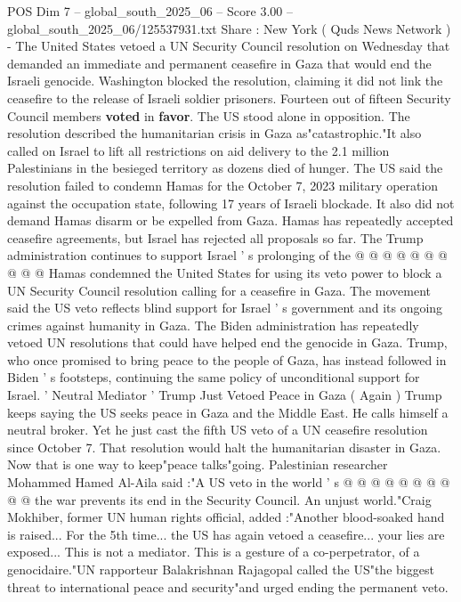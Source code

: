 \begin{textsample}{POS Dim 7 – global\_south\_2025\_06 – Score 3.00 – global\_south\_2025\_06/125537931.txt}  \label{ex:f7_pos_403}
Share : New York ( Quds News Network ) - The United States vetoed a UN Security Council resolution on Wednesday that demanded an immediate and permanent ceasefire in Gaza that would end the Israeli genocide.
Washington blocked the resolution, claiming it did not link the ceasefire to the release of Israeli soldier prisoners.
Fourteen out of fifteen Security Council members \textbf{voted} in \textbf{favor}.
The US stood alone in opposition.
The resolution described the humanitarian crisis in Gaza as"catastrophic."It also called on Israel to lift all restrictions on aid delivery to the 2.1 million Palestinians in the besieged territory as dozens died of hunger.
The US said the resolution failed to condemn Hamas for the October 7, 2023 military operation against the occupation state, following 17 years of Israeli blockade.
It also did not demand Hamas disarm or be expelled from Gaza.
Hamas has repeatedly accepted ceasefire agreements, but Israel has rejected all proposals so far.
The Trump administration continues to support Israel ' s prolonging of the @ @ @ @ @ @ @ @ @ @ Hamas condemned the United States for using its veto power to block a UN Security Council resolution calling for a ceasefire in Gaza.
The movement said the US veto reflects blind support for Israel ' s government and its ongoing crimes against humanity in Gaza.
The Biden administration has repeatedly vetoed UN resolutions that could have helped end the genocide in Gaza.
Trump, who once promised to bring peace to the people of Gaza, has instead followed in Biden ' s footsteps, continuing the same policy of unconditional support for Israel. ' Neutral Mediator ' Trump Just Vetoed Peace in Gaza ( Again ) Trump keeps saying the US seeks peace in Gaza and the Middle East.
He calls himself a neutral broker.
Yet he just cast the fifth US veto of a UN ceasefire resolution since October 7.
That resolution would halt the humanitarian disaster in Gaza.
Now that is one way to keep"peace talks"going.
Palestinian researcher Mohammed Hamed Al-Aila said :"A US veto in the world ' s @ @ @ @ @ @ @ @ @ @ the war prevents its end in the Security Council.
An unjust world."Craig Mokhiber, former UN human rights official, added :"Another blood-soaked hand is raised...
For the 5th time... the US has again vetoed a ceasefire... your lies are exposed...
This is not a mediator.
This is a gesture of a co-perpetrator, of a genocidaire."UN rapporteur Balakrishnan Rajagopal called the US"the biggest threat to international peace and security"and urged ending the permanent veto.

\end{textsample}
